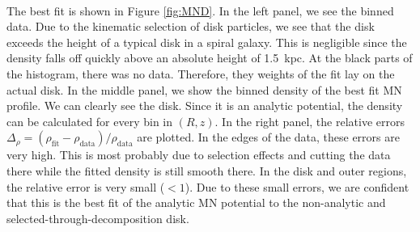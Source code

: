 \\The best fit is shown in Figure \ref{fig:MND}. In the left panel, we see the binned data. Due to the kinematic selection of disk particles, we see that the disk exceeds the height of a typical disk in a spiral galaxy. This is negligible since the density falls off quickly above an absolute height of \SI{1.5}{kpc}. At the black parts of the histogram, there was no data. Therefore, they weights of the fit lay on the actual disk. In the middle panel, we show the binned density of the best fit \ac{MN} profile. We can clearly see the disk. Since it is an analytic potential, the density can be calculated for every bin in $(R, z)$. In the right panel, the relative errors \(\Delta_\rho = (\rho_{\mathrm{fit}}- \rho_{\mathrm{data}})/\rho_{\mathrm{data}}\) are plotted. In the edges of the data, these errors are very high. This is most probably due to selection effects and cutting the data there while the fitted density is still smooth there. In the disk and outer regions, the relative error is very small (\(<1\)). Due to these small errors, we are confident that this is the best fit of the analytic \ac{MN} potential to the non-analytic and selected-through-decomposition disk. 


